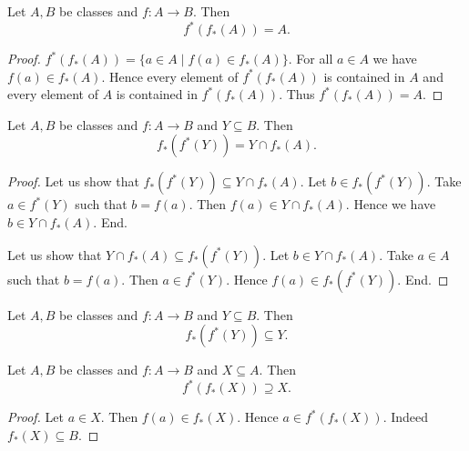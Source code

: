 \documentclass[../../set-theory/set-theory.tex]{subfiles}
\begin{document}
  \begin{forthel}
    \begin{proposition}
      Let $A, B$ be classes and $f : A \to B$.
      Then \[ f^{*}(f_{*}(A)) = A. \]
    \end{proposition}
    \begin{proof}
      $f^{*}(f_{*}(A)) = \{ a \in A \mid f(a) \in f_{*}(A) \}$.
      For all $a \in A$ we have $f(a) \in f_{*}(A)$.
      Hence every element of $f^{*}(f_{*}(A))$ is contained in $A$ and every
      element of $A$ is contained in $f^{*}(f_{*}(A))$.
      Thus $f^{*}(f_{*}(A)) = A$.
    \end{proof}
  \end{forthel}

  \begin{forthel}
    \begin{proposition}
      Let $A, B$ be classes and $f : A \to B$ and $Y \subseteq B$.
      Then \[ f_{*}(f^{*}(Y)) = Y \cap f_{*}(A). \]
    \end{proposition}
    \begin{proof}
      Let us show that $f_{*}(f^{*}(Y)) \subseteq Y \cap f_{*}(A)$.
        Let $b \in f_{*}(f^{*}(Y))$.
        Take $a \in f^{*}(Y)$ such that $b = f(a)$.
        Then $f(a) \in Y \cap f_{*}(A)$.
        Hence we have $b \in Y \cap f_{*}(A)$.
      End.

      Let us show that $Y \cap f_{*}(A) \subseteq f_{*}(f^{*}(Y))$.
        Let $b \in Y \cap f_{*}(A)$.
        Take $a \in A$ such that $b = f(a)$.
        Then $a \in f^{*}(Y)$.
        Hence $f(a) \in f_{*}(f^{*}(Y))$.
      End.
    \end{proof}
  \end{forthel}

  \begin{forthel}
    \begin{corollary}
      Let $A, B$ be classes and $f : A \to B$ and $Y \subseteq B$.
      Then \[ f_{*}(f^{*}(Y)) \subseteq Y. \]
    \end{corollary}
  \end{forthel}

  \begin{forthel}
    \begin{proposition}
      Let $A, B$ be classes and $f : A \to B$ and $X \subseteq A$.
      Then \[ f^{*}(f_{*}(X)) \supseteq X. \]
    \end{proposition}
    \begin{proof}
      Let $a \in X$.
      Then $f(a) \in f_{*}(X)$.
      Hence $a \in f^{*}(f_{*}(X))$.
      Indeed $f_{*}(X) \subseteq B$.
    \end{proof}
  \end{forthel}
\end{document}
